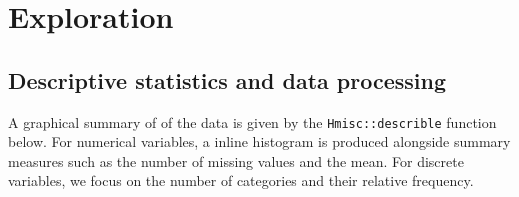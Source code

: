 \documentclass[]{interact}
\theoremstyle{plain}%
\theoremstyle{definition}
\theoremstyle{remark}
\begin{document}
\hypertarget{exploratory}{%
\section{Exploration}\label{exploratory}}

\hypertarget{descriptive}{%
\subsection{Descriptive statistics and data processing}\label{descriptive}}

A graphical summary of of the data is given by the \texttt{Hmisc::describle} function below. For numerical variables, a inline histogram is produced alongside summary measures such as the number of missing values and the mean. For discrete variables, we focus on the number of categories and their relative frequency.
\end{document}
